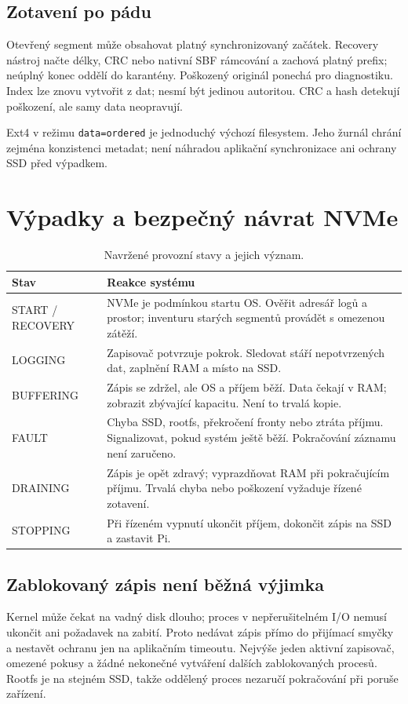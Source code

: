 \documentclass[11pt,a4paper]{article}
\newcommand{\novastrana}{\clearpage}
\begin{document}
\subsection{Zotavení po pádu}
Otevřený segment může obsahovat platný synchronizovaný začátek. Recovery nástroj načte délky, CRC nebo nativní SBF rámcování a zachová platný prefix; neúplný konec oddělí do karantény. Poškozený originál ponechá pro diagnostiku. Index lze znovu vytvořit z dat; nesmí být jedinou autoritou. CRC a hash detekují poškození, ale samy data neopravují.

Ext4 v režimu \texttt{data=ordered} je jednoduchý výchozí filesystem. Jeho žurnál chrání zejména konzistenci metadat; není náhradou aplikační synchronizace ani ochrany SSD před výpadkem.\cite{ext4}

\novastrana
\section{Výpadky a bezpečný návrat NVMe}
\begin{table}[htbp]\centering\small
\caption{Navržené provozní stavy a jejich význam.}
\begin{tabularx}{\textwidth}{L{32mm}Y}
\toprule Stav & Reakce systému\\\midrule
START / RECOVERY & NVMe je podmínkou startu OS. Ověřit adresář logů a prostor; inventuru starých segmentů provádět s omezenou zátěží.\\\addlinespace
LOGGING & Zapisovač potvrzuje pokrok. Sledovat stáří nepotvrzených dat, zaplnění RAM a místo na SSD.\\\addlinespace
BUFFERING & Zápis se zdržel, ale OS a příjem běží. Data čekají v RAM; zobrazit zbývající kapacitu. Není to trvalá kopie.\\\addlinespace
FAULT & Chyba SSD, rootfs, překročení fronty nebo ztráta příjmu. Signalizovat, pokud systém ještě běží. Pokračování záznamu není zaručeno.\\\addlinespace
DRAINING & Zápis je opět zdravý; vyprazdňovat RAM při pokračujícím příjmu. Trvalá chyba nebo poškození vyžaduje řízené zotavení.\\\addlinespace
STOPPING & Při řízeném vypnutí ukončit příjem, dokončit zápis na SSD a zastavit Pi.\\
\bottomrule\end{tabularx}\end{table}

\subsection{Zablokovaný zápis není běžná výjimka}
Kernel může čekat na vadný disk dlouho; proces v nepřerušitelném I/O nemusí ukončit ani požadavek na zabití. Proto nedávat zápis přímo do přijímací smyčky a nestavět ochranu jen na aplikačním timeoutu. Nejvýše jeden aktivní zapisovač, omezené pokusy a žádné nekonečné vytváření dalších zablokovaných procesů. Rootfs je na stejném SSD, takže oddělený proces nezaručí pokračování při poruše zařízení.
\end{document}

